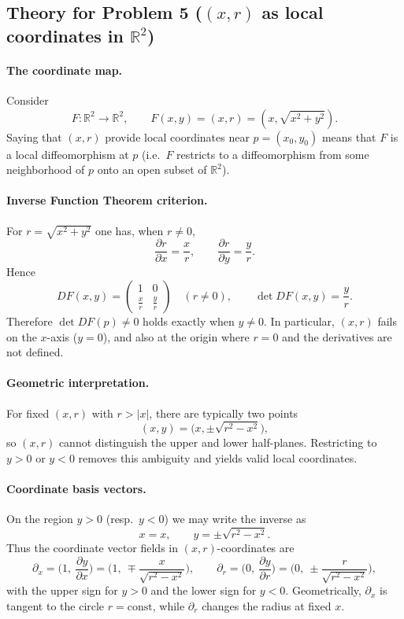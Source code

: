 \documentclass[12pt,a4paper]{article}
\theoremstyle{plain}
\theoremstyle{definition}      %
\begin{document}
\subsection*{Theory for Problem 5 ($(x,r)$ as local coordinates in $\mathbb R^2$)}

\paragraph{The coordinate map.}
Consider
\[
F:\mathbb R^2\to\mathbb R^2,\qquad F(x,y)=(x,r)=(x,\sqrt{x^2+y^2}).
\]
Saying that $(x,r)$ provide local coordinates near $p=(x_0,y_0)$ means that $F$ is a local diffeomorphism at $p$
(i.e.\ $F$ restricts to a diffeomorphism from some neighborhood of $p$ onto an open subset of $\mathbb R^2$).

\paragraph{Inverse Function Theorem criterion.}
For $r=\sqrt{x^2+y^2}$ one has, when $r\neq 0$,
\[
\frac{\partial r}{\partial x}=\frac{x}{r},
\qquad
\frac{\partial r}{\partial y}=\frac{y}{r}.
\]
Hence
\[
DF(x,y)=
\begin{pmatrix}
	1 & 0\\[2pt]
	\frac{x}{r} & \frac{y}{r}
\end{pmatrix}
\quad (r\neq 0),
\qquad
\det DF(x,y)=\frac{y}{r}.
\]
Therefore $\det DF(p)\neq 0$ holds exactly when $y\neq 0$.
In particular, $(x,r)$ fails on the $x$-axis ($y=0$), and also at the origin where $r=0$ and the derivatives are not defined.

\paragraph{Geometric interpretation.}
For fixed $(x,r)$ with $r>|x|$, there are typically two points
\[
(x,y)=\big(x,\pm\sqrt{r^2-x^2}\big),
\]
so $(x,r)$ cannot distinguish the upper and lower half-planes.
Restricting to $y>0$ or $y<0$ removes this ambiguity and yields valid local coordinates.

\paragraph{Coordinate basis vectors.}
On the region $y>0$ (resp.\ $y<0$) we may write the inverse as
\[
x=x,\qquad y=\pm\sqrt{r^2-x^2}.
\]
Thus the coordinate vector fields in $(x,r)$-coordinates are
\[
\partial_x=\Big(1,\ \frac{\partial y}{\partial x}\Big)
=\Big(1,\ \mp\frac{x}{\sqrt{r^2-x^2}}\Big),
\qquad
\partial_r=\Big(0,\ \frac{\partial y}{\partial r}\Big)
=\Big(0,\ \pm\frac{r}{\sqrt{r^2-x^2}}\Big),
\]
with the upper sign for $y>0$ and the lower sign for $y<0$.
Geometrically, $\partial_x$ is tangent to the circle $r=\mathrm{const}$, while $\partial_r$ changes the radius at fixed $x$.
\end{document}
